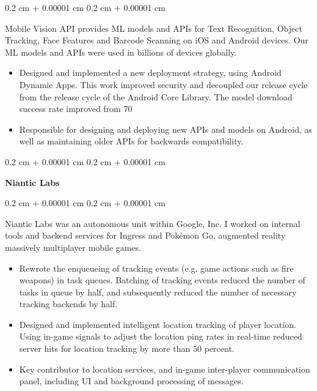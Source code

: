 \documentclass[12pt, letterpaper]{article}
\newenvironment{highlights}{
    \begin{itemize}[
        topsep=0.10 cm,
        parsep=0.10 cm,
        partopsep=0pt,
        itemsep=0pt,
        leftmargin=0.4 cm + 10pt
    ]
}{
    \end{itemize}
} %
\newenvironment{onecolentry}{
    \begin{adjustwidth}{
        0.2 cm + 0.00001 cm
    }{
        0.2 cm + 0.00001 cm
    }
}{
    \end{adjustwidth}
} %
\begin{document}
        \begin{onecolentry}
            Mobile Vision API provides ML models and APIs for Text Recognition, Object Tracking, Face Features and Barcode Scanning on iOS and Android devices.  Our ML models and APIs were used in billions of devices globally.
            \begin{highlights}
                \item Designed and implemented a new deployment strategy, using Android Dynamic Apps. This work improved security and decoupled our release cycle from the release cycle of the Android Core Library.  The model download success rate improved from 70%
                \item Responsible for designing and deploying new APIs and models on Android, as well as maintaining older APIs for backwards compatibility.
            \end{highlights}
        \end{onecolentry}
        
        \begin{onecolentry}
            \textbf{Niantic Labs}
        \end{onecolentry}

        \vspace{0.10 cm}
        \begin{onecolentry}
            Niantic Labs was an autonomous unit within Google, Inc.  I worked on internal tools and backend services for Ingress and Pokémon Go, augmented reality massively multiplayer mobile games.
            \begin{highlights}
                \item Rewrote the enqueueing of tracking events (e.g. game actions such as fire weapons) in task queues.  Batching of tracking events reduced the number of tasks in queue by half, and subsequently reduced the number of necessary tracking backends by half.
                \item Designed and implemented intelligent location tracking of player location.  Using in-game signals to adjust the location ping rates in real-time reduced server hits for location tracking by more than 50 percent.
                \item Key contributor to location services, and in-game inter-player communication panel, including UI and background processing of messages.
            \end{highlights}
        \end{onecolentry}
\end{document}

